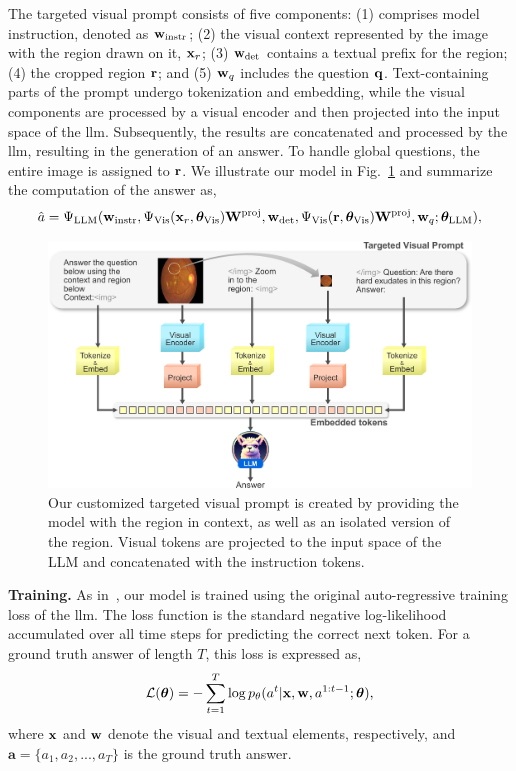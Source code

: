 The targeted visual prompt consists of five components: (1) comprises model instruction, denoted as $\mathbf{w}_{\text{instr}}$; (2) the visual context represented by the image with the region drawn on it, $\mathbf{x}_r$; (3) $\mathbf{w}_\text{det}$ contains a textual prefix for the region; (4) the cropped region $\mathbf{r}$; and (5) $\mathbf{w}_q$ includes the question $\mathbf{q}$. Text-containing parts of the prompt undergo tokenization and embedding, while the visual components are processed by a visual encoder and then projected into the input space of the \gls{llm}. Subsequently, the results are concatenated and processed by the \gls{llm}, resulting in the generation of an answer. To handle global questions, the entire image is assigned to $\mathbf{r}$. We illustrate our model in Fig.~\ref{fig:method} and summarize the computation of the answer as,
\begin{equation}
    \hat{a} = \Psi_{\text{LLM}} (\mathbf{w}_{\text{instr}}, \Psi_{\text{Vis}} (\mathbf{x}_r, \bm{\theta}_{\text{Vis}})\mathbf{W}^\text{proj}, \mathbf{w}_\text{det}, \Psi_{\text{Vis}} (\mathbf{r}, \bm{\theta}_{\text{Vis}})\mathbf{W}^\text{proj}, \mathbf{w}_q; \bm{\theta}_{\text{LLM}}),
\end{equation}

\begin{figure}[!t]
\begin{center}
\includegraphics[width=\textwidth]{Figures/Part1_LocVQA/02_llm/method.pdf}
\caption{Our customized targeted visual prompt is created by providing the model with the region in context, as well as an isolated version of the region. Visual tokens are projected to the input space of the LLM and concatenated with the instruction tokens.}
\label{fig:method}
\end{center}
\end{figure}

\textbf{Training. } As in~\cite{wang2023r2gengpt}, our model is trained using the original auto-regressive training loss of the \gls{llm}. The loss function is the standard negative log-likelihood accumulated over all time steps for predicting the correct next token. For a ground truth answer of length $T$, this loss is expressed as,
\begin{equation}
    \mathcal{L}(\bm{\theta}) = - \sum_{t=1}^T \log p_\theta(a^t | \mathbf{x}, \mathbf{w}, a^{1:t-1}; \bm{\theta}),
\end{equation}
\noindent
where $\mathbf{x}$ and $\mathbf{w}$ denote the visual and textual elements, respectively, and $\mathbf{a} = \{a_1, a_2, ..., a_T\}$ is the ground truth answer.
